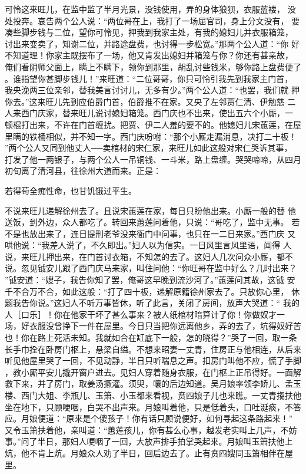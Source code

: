 可怜这来旺儿，在监中监了半月光景，没钱使用，弄的身体狼狈，衣服蓝褛，
没处投奔。哀告两个公人说：“两位哥在上，我打了一场屈官司，身上分文没有，
要凑些脚步钱与二位，望你可怜见，押我到我家主处，有我的媳妇儿并衣服箱笼，
讨出来变卖了，知谢二位，并路途盘费，也讨得一步松宽。”那两个公人道：“你
好不知道理！你家主既摆布了一场，他又肯发出媳妇并箱笼与你？你还有甚亲故，
俺们看阴师父面上，瞒上不瞒下，领你到那里，胡乱讨些钱米，够你路上盘费便了
。谁指望你甚脚步钱儿！”来旺道：“二位哥哥，你只可怜引我先到我家主门首，
我央浼两三位亲邻，替我美言讨讨儿，无多有少。”两个公人道：“也罢，我们就
押你去。”这来旺儿先到应伯爵门首，伯爵推不在家。又央了左邻贾仁清、伊勉慈
二人来西门庆家，替来旺儿说讨媳妇箱笼。西门庆也不出来，使出五六个小厮，一
顿棍打出来，不许在门首缠扰。把贾、伊二人羞的要不的。他媳妇儿宋蕙莲，在屋
里瞒的铁桶相似，并不知一字。西门庆吩咐：“那个小厮走漏消息，决打二十板！
”两个公人又同到他丈人──卖棺材的宋仁家，来旺儿如此这般对宋仁哭诉其事，
打发了他一两银子，与两个公人一吊铜钱、一斗米，路上盘缠。哭哭啼啼，从四月
初旬离了清河县，往徐州大道而来。正是：

若得苟全痴性命，也甘饥饿过平生。

不说来旺儿递解徐州去了。且说宋蕙莲在家，每日只盼他出来。小厮一般的替
他送饭，到外边，众人都吃了。转回来蕙莲问着他，只说：“哥吃了，监中无事。
若不是也放出来了，连日提刑老爷没来衙门中问事，也只在一二日来家。”西门庆
又哄他说：“我差人说了，不久即出。”妇人以为信实。一日风里言风里语，闻得
人说，来旺儿押出来，在门首讨衣箱，不知怎的去了。这妇人几次问众小厮，都不
说。忽见钺安儿跟了西门庆马来家，叫住问他：“你旺哥在监中好么？几时出来？
”钺安道：“嫂子，我告你知了罢，俺哥这早晚到流沙河了。”蕙莲问其故，这钺
安千不合万不合，如此这般：“打了四十板，递解原籍徐州家去了。只放你心里，
休题我告你说。”这妇人不听万事皆休，听了此言，关闭了房间，放声大哭道：“
我的人［口乐］！你在他家干坏了甚么事来？被人纸棺材暗算计了你！你做奴才一
场，好衣服没曾挣下一件在屋里。今日只当把你远离他乡，弄的去了，坑得奴好苦
也！你在路上死活未知。我就如合在缸底下一般，怎的晓得？”哭了一回，取一条
长手巾拴在卧房门枢上，悬梁自缢。不想来昭妻一丈青，住房正与他相连，从后来
听见他屋里哭了一回，不见动静，半日只听喘息之声。扣房门叫他不应，慌了手脚
，教小厮平安儿撬开窗户进去。见妇人穿着随身衣服，在门枢上正吊得好。一面解
救下来，并了房门，取姜汤撅灌。须臾，嚷的后边知道。吴月娘率领李娇儿、孟玉
楼、西门大姐、李瓶儿、玉箫、小玉都来看视，贲四娘子儿也来瞧。一丈青搊扶他
坐在地下，只顾哽咽，白哭不出声来。月娘叫着他，只是低着头，口吐涎痰，不答
应。月娘便道：“原来是个傻孩子！你有话只顾说便好，如何寻起这条路起来！”
又令玉箫扶着他，亲叫道：“蕙莲孩儿，你有甚么心事，越发老实叫上几声，不妨
事。”问了半日，那妇人哽咽了一回，大放声排手拍掌哭起来。月娘叫玉箫扶他上
炕，他不肯上炕。月娘众人劝了半日，回后边去了。止有贲四嫂同玉箫相伴在屋
里。

